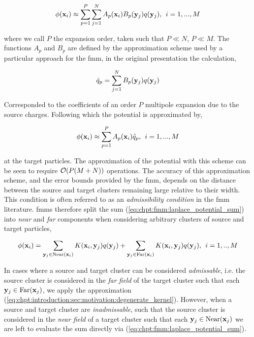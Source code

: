 \begin{equation}
    \phi(\mathbf{x}_i) \approx \sum_{p=1}^P \sum_{j=1}^N A_p(\mathbf{x}_i) B_p(\mathbf{y}_j)q(\mathbf{y}_j), \> \> i = 1,...,M
    \label{eq:chpt:introduction:sec:motivation:degenerate_kernel}
\end{equation}

where we call $P$ the expansion order, taken such that $P \ll N$, $P \ll M$. The functions $A_p$ and $B_p$ are defined by the approximation scheme used by a particular approach for the \acrshort{fmm}, in the original presentation the calculation,

\begin{equation}
    \hat{q}_p = \sum_{j=1}^N B_p(\mathbf{y}_j)q(\mathbf{y}_j)
\end{equation}

Corresponded to the coefficients of an order $P$ multipole expansion due to the source charges. Following which the potential is approximated by,

\begin{equation}
    \phi(\mathbf{x}_i) \approx \sum_{p=1}^P A_p(\mathbf{x}_i)\hat{q}_p, \> \> i = 1,...,M
\end{equation}

at the target particles. The approximation of the potential with this scheme can be seen to require $\mathcal{O}(P(M+N))$ operations. The accuracy of this approximation scheme, and the error bounds provided by the \acrshort{fmm}, depends on the distance between the source and target clusters remaining large relative to their width. This condition is often referred to as an \textit{admissibility condition} in the \acrshort{fmm} literature. \acrshort{fmm}s therefore split the sum (\ref{eq:chpt:fmm:laplace_potential_sum}) into \textit{near} and \textit{far} components when considering arbitrary clusters of source and target particles,

\begin{equation}
    \phi(\mathbf{x}_i) = \sum_{\mathbf{y}_j \in \text{Near}(\mathbf{x}_i)} K(\mathbf{x}_i, \mathbf{y}_j) q(\mathbf{y}_j) +  \sum_{\mathbf{y}_j \in \text{Far}(\mathbf{x}_i)} K(\mathbf{x}_i, \mathbf{y}_j) q(\mathbf{y}_j), \> \> i=1,..,M
\end{equation}

In cases where a source and target cluster can be considered \textit{admissable}, i.e. the source cluster is considered in the \textit{far field} of the target cluster such that each $\mathbf{y}_j \in \text{Far}(\mathbf{x}_j)$, we apply the approximation (\ref{eq:chpt:introduction:sec:motivation:degenerate_kernel}). However, when a source and target cluster are \textit{inadmissable}, such that the source cluster is considered in the \textit{near field} of a target cluster such that each $\mathbf{y}_j \in \text{Near}(\mathbf{x}_j)$ we are left to evaluate the sum directly via (\ref{eq:chpt:fmm:laplace_potential_sum}).

